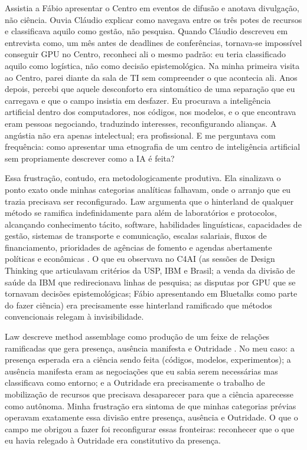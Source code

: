 Assistia a Fábio apresentar o Centro em eventos de difusão e anotava divulgação, não ciência. Ouvia Cláudio explicar como navegava entre os três potes de recursos e classificava aquilo como gestão, não pesquisa. Quando Cláudio descreveu em entrevista como, um mês antes de deadlines de conferências, tornava-se impossível conseguir GPU no Centro, reconheci ali o mesmo padrão: eu teria classificado aquilo como logística, não como decisão epistemológica. Na minha primeira visita ao Centro, parei diante da sala de TI sem compreender o que acontecia ali. Anos depois, percebi que aquele desconforto era sintomático de uma separação que eu carregava e que o campo insistia em desfazer. Eu procurava a inteligência artificial dentro dos computadores, nos códigos, nos modelos, e o que encontrava eram pessoas negociando, traduzindo interesses, reconfigurando alianças. A angústia não era apenas intelectual; era profissional. E me perguntava com frequência: como apresentar uma etnografia de um centro de inteligência artificial sem propriamente descrever como a IA é feita?

Essa frustração, contudo, era metodologicamente produtiva. Ela sinalizava o ponto exato onde minhas categorias analíticas falhavam, onde o arranjo que eu trazia precisava ser reconfigurado. Law argumenta que o hinterland de qualquer método se ramifica indefinidamente para além de laboratórios e protocolos, alcançando conhecimento tácito, software, habilidades linguísticas, capacidades de gestão, sistemas de transporte e comunicação, escalas salariais, fluxos de financiamento, prioridades de agências de fomento e agendas abertamente políticas e econômicas \parencite[p. 41-42]{Law2004After}. O que eu observava no C4AI (as sessões de Design Thinking que articulavam critérios da USP, IBM e Brasil; a venda da divisão de saúde da IBM que redirecionava linhas de pesquisa; as disputas por GPU que se tornavam decisões epistemológicas; Fábio apresentando em Bluetalks como parte do fazer ciência) era precisamente esse hinterland ramificado que métodos convencionais relegam à invisibilidade.

Law descreve method assemblage como produção de um feixe de relações ramificadas que gera presença, ausência manifesta e Outridade \parencite[p. 84]{Law2004After}. No meu caso: a presença esperada era a ciência sendo feita (códigos, modelos, experimentos); a ausência manifesta eram as negociações que eu sabia serem necessárias mas classificava como entorno; e a Outridade era precisamente o trabalho de mobilização de recursos que precisava desaparecer para que a ciência aparecesse como autônoma. Minha frustração era sintoma de que minhas categorias prévias operavam exatamente essa divisão entre presença, ausência e Outridade. O que o campo me obrigou a fazer foi reconfigurar essas fronteiras: reconhecer que o que eu havia relegado à Outridade era constitutivo da presença.

